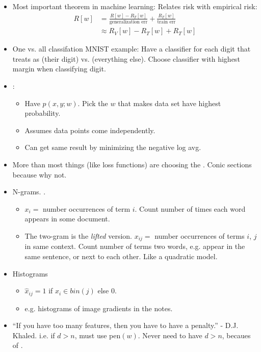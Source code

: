 \documentclass[12pt]{article}
\begin{document}
\begin{itemize}
	\item Most important theorem in machine learning: Relates risk with empirical risk:
	\begin{align}
	R[w] &=  \frac{R[w] - R_T[w]}{\text{generalization err}} + \frac{R_T[w]}{\text{train err}} \\
	&\approx R_V[w] - R_T[w] + R_T[w]
	\end{align}
	\item One vs. all classifation MNIST example: Have a classifier for each digit that treats as (their digit) vs. (everything else). Choose classifier with highest margin when classifying digit.
	\item {}:
	\begin{itemize}
		\item Have $p(x,y; w)$. Pick the $w$ that makes data set have highest probability.
		\item Assumes data points come independently.
		\item Can get same result by minimizing the negative log avg.
	\end{itemize}
	\item More than most things (like loss functions) are choosing the . Conic sections because why not.
	\item N-grams. .
	\begin{itemize}
		\item $x_i =$ number occurrences of term $i$. Count number of times each word appears in some document.
		\item The two-gram is the \textit{lifted} version. $x_{ij} =$ number occurrences of terms $i$, $j$ in same context. Count number of terms two words, e.g. appear in the same sentence, or next to each other. Like a quadratic model.
	\end{itemize}
	\item Histograms
	\begin{itemize}
		\item $\hat{x}_{ij} = 1$ if $x_i \in bin(j)$ else 0.
		\item e.g. histograms of image gradients in the notes.
	\end{itemize}
	\item ``If you have too many features, then you have to have a penalty.'' - D.J. Khaled. i.e. if $d>n$, must use pen$(w)$. Never need to have $d>n$, becaues of .
\end{itemize}


\end{document}
